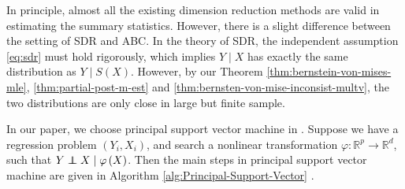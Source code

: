 In principle, almost all the existing dimension reduction methods
are valid in estimating the summary statistics. However, there is
a slight difference between the setting of SDR and ABC. In the theory
of SDR, the independent assumption \ref{eq:sdr} must hold rigorously,
which implies $Y\mid X$ has exactly the same distribution as $Y\mid S\left(X\right)$.
However, by our Theorem \ref{thm:bernstein-von-mises-mle}, \ref{thm:partial-post-m-est}
and \ref{thm:bernsten-von-mise-inconsist-multv}, the two distributions
are only close in large but finite sample. 

In our paper, we choose principal support vector machine in \citet{li2011principal}.
Suppose we have a regression problem $\left(Y_{i},X_{i}\right)$,
and search a nonlinear transformation $\varphi:\mathbb{R}^{p}\rightarrow\mathbb{R}^{d}$,
such that $Y\independent X\mid\varphi\left(X\right)$. Then the main
steps in principal support vector machine are given in Algorithm \ref{alg:Principal-Support-Vector}
. 


